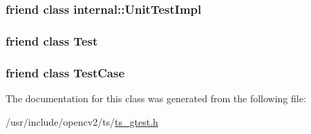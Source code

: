 \hypertarget{classtesting_1_1TestInfo_acc0a5e7573fd6ae7ad1878613bb86853}{
\subsubsection[{internal\-::\-Unit\-Test\-Impl}]{\setlength{\rightskip}{0pt plus 5cm}friend class internal\-::\-Unit\-Test\-Impl\hspace{0.3cm}{\ttfamily [friend]}}}\label{classtesting_1_1TestInfo_acc0a5e7573fd6ae7ad1878613bb86853}
\hypertarget{classtesting_1_1TestInfo_a5b78b1c2e1fa07ffed92da365593eaa4}{
\subsubsection[{Test}]{\setlength{\rightskip}{0pt plus 5cm}friend class {\bf Test}\hspace{0.3cm}{\ttfamily [friend]}}}\label{classtesting_1_1TestInfo_a5b78b1c2e1fa07ffed92da365593eaa4}
\hypertarget{classtesting_1_1TestInfo_aff779e55b06adfa7c0088bd10253f0f0}{
\subsubsection[{Test\-Case}]{\setlength{\rightskip}{0pt plus 5cm}friend class {\bf Test\-Case}\hspace{0.3cm}{\ttfamily [friend]}}}\label{classtesting_1_1TestInfo_aff779e55b06adfa7c0088bd10253f0f0}


The documentation for this class was generated from the following file\-:\begin{DoxyCompactItemize}
\item 
/usr/include/opencv2/ts/\hyperlink{ts__gtest_8h}{ts\-\_\-gtest.\-h}\end{DoxyCompactItemize}
